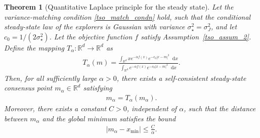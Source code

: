 \documentclass[10pt,a4paper]{amsart}
\newtheorem{theorem}{Theorem}
\def\R{\mathbb{R}}
\newcommand*\der{\mathop{}\!\mathrm{d}}
\begin{document}
\begin{theorem}[Quantitative Laplace principle for the steady state]
\label{thm:steady_state_laplace}
Let the variance-matching condition \eqref{tso_match_condn} hold, such that the conditional steady-state law of the explorers is Gaussian with variance $\sigma_\star^2 = \sigma_J^2$, and let $c_0 = 1/(2\sigma_\star^2)$. Let the objective function $f$ satisfy Assumption~\ref{tso_assum_2}. Define the mapping $T_\alpha: \mathbb{R}^d \to \mathbb{R}^d$ as
\begin{align}
    T_\alpha(m) = \frac{\int_{\R^d} x e^{-\alpha f(x)} e^{-c_0 |x - m|^2} \der x}{\int_{\mathbb{R}^d} e^{-\alpha f(x)} e^{-c_0 |x - m|^2} \der x}.
\end{align}
Then, for all sufficiently large $\alpha > 0$, there exists a self-consistent steady-state consensus point $m_\alpha \in \mathbb{R}^d$ satisfying 
\begin{align}\label{tso_eqn_3.15}
    m_\alpha = T_\alpha(m_\alpha).
\end{align}
Moreover, there exists a constant $C > 0$, independent of $\alpha$, such that the distance between $m_\alpha$ and the global minimum satisfies the bound
\begin{align}
    |m_\alpha - x_{\min}| \le \frac{C}{\alpha}.
\end{align}
\end{theorem}
\end{document}

